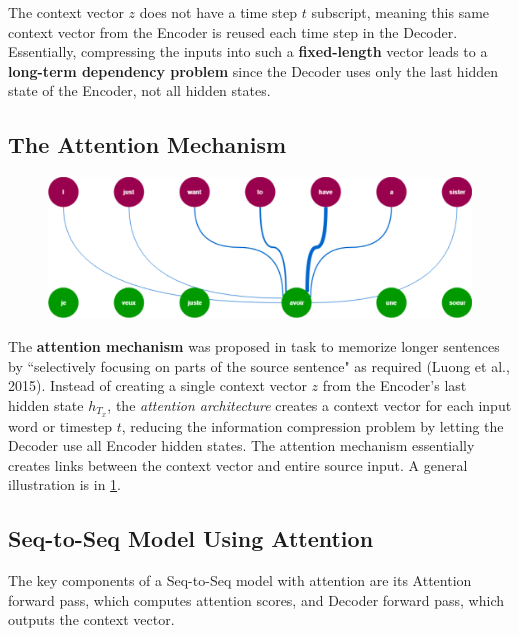 The context vector $z$ does not have a time step $t$ subscript, meaning this same context vector from the Encoder is reused each time step in the Decoder. Essentially, compressing the inputs into such a \textbf{fixed-length} vector leads to a \textbf{long-term dependency problem} since the Decoder uses only the last hidden state of the Encoder, not all hidden states. 


\subsection{The Attention Mechanism} \label{sec:AttentionMechanism}


{
\begin{figure}
\begin{center}
    \vspace{-20pt}
    \includegraphics[width=\linewidth]{imgs/attention.png}
\end{center}
\vspace{-10pt}
\label{fig:attention}
\end{figure}

The \textbf{attention mechanism} was proposed in  task to memorize longer sentences by ``selectively focusing on parts of the source sentence" as required (Luong et al., 2015). Instead of creating a single context vector $z$ from the Encoder's last hidden state $h_{T_x}$, the \emph{attention architecture} creates a context vector for each input word or timestep $t$, reducing the information compression problem by letting the Decoder use all Encoder hidden states. The attention mechanism essentially creates links between the context vector and entire source input. A general illustration is in \cref{fig:attention}.

\subsection{Seq-to-Seq Model Using Attention}

The key components of a Seq-to-Seq model with attention are its Attention forward pass, which computes attention scores, and Decoder forward pass, which outputs the context vector. 

}


